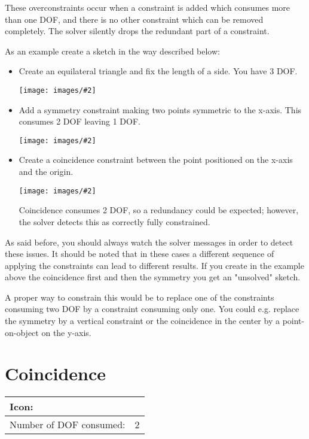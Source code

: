 \documentclass[12pt,titlepage]{article}
\newcommand{\icon}[1]{\raisebox{-1em}{\rule{0pt}{27pt}\texttt{[image: images/\#1]}}}
\newcommand{\img}[2]{\vspace{2ex}\noindent\texttt{[image: images/\#2]}}
\newcommand{\dofConsumed}{Number of DOF consumed:}
\begin{document}
\begin{description}
      These overconstraints occur when a constraint is added which consumes
      more than one DOF, and there is no other constraint which can be removed
      completely. The solver silently drops the redundant part of a constraint.

      As an example create a sketch in the way described below:

      \begin{itemize}
      \item Create an equilateral triangle and fix the length of a side. You
            have 3 DOF.

\newcommand{\scale}{0.66}%
\img{scale=\scale}{equiTriangle1}

  \item Add a symmetry constraint making two points symmetric to the x-axis.
        This consumes 2 DOF leaving 1 DOF.

\img{scale=\scale}{equiTriangle2}

      \item Create a coincidence constraint between the point positioned on
            the x-axis and the origin. 

\img{scale=\scale}{equiTriangle3}

      Coincidence consumes 2 DOF, so a redundancy could be expected; however,
      the solver detects this as correctly fully constrained.
      \end{itemize}

      As said before, you should always watch the solver messages in order to
      detect these issues.
      It should be noted that in these cases a different sequence of applying
      the constraints can lead to different results. If you create in the
      example above the coincidence first and then the symmetry you get an
      "unsolved" sketch.

      A proper way to constrain this would be to replace one of the
      constraints consuming two DOF by a constraint consuming only one.
      You could e.g. replace the symmetry by a vertical constraint or the
      coincidence in the center by a point-on-object on the y-axis.
\end{description}


\section{Coincidence}
\begin{tabular}{|l|l|}
\hline
Icon: & \icon{Constraint_PointOnPoint}\\
\hline
\dofConsumed & 2 \\
\hline
\end{tabular}
\end{document}
